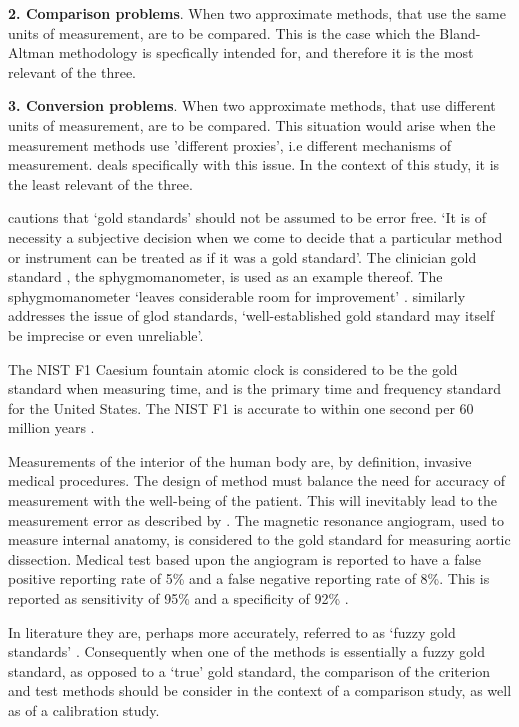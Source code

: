 \documentclass[MAIN.tex]{subfiles}
\begin{document}
	\bigskip \textbf{2. Comparison problems}. When two approximate
	methods, that use the same units of measurement, are to be
	compared. This is the case which the Bland-Altman methodology is
	specfically intended for, and therefore it is the most relevant of
	the three.
	
	\bigskip \textbf{3. Conversion problems}. When two approximate
	methods, that use different units of measurement, are to be
	compared. This situation would arise when the measurement methods
	use 'different proxies', i.e different mechanisms of measurement.
	\citet{lewis} deals specifically with this issue. In the context
	of this study, it is the least relevant of the three.
	
	\citet[p.47]{DunnSEME} cautions that `gold standards' should not be
	assumed to be error free. `It is of necessity a subjective
	decision when we come to decide that a particular method or
	instrument can be treated as if it was a gold standard'. The
	clinician gold standard , the sphygmomanometer, is used as an
	example thereof.  The sphygmomanometer `leaves considerable room
	for improvement' \citep{DunnSEME}. \citet{pizzi} similarly
	addresses the issue of glod standards, `well-established gold
	standard may itself be imprecise or even unreliable'.
	
	
	The NIST F1 Caesium fountain atomic clock is considered to be the
	gold standard when measuring time, and is the primary time and
	frequency standard for the United States. The NIST F1 is accurate
	to within one second per 60 million years \citep{NIST}.
	
	Measurements of the interior of the human body are, by definition,
	invasive medical procedures. The design of method must balance the
	need for accuracy of measurement with the well-being of the
	patient. This will inevitably lead to the measurement error as
	described by \citet{DunnSEME}. The magnetic resonance angiogram,
	used to measure internal anatomy,  is considered to the gold
	standard for measuring aortic dissection. Medical test based upon
	the angiogram is reported to have a false positive reporting rate
	of 5\% and a false negative reporting rate of 8\%. This is
	reported as sensitivity of 95\% and a specificity of 92\%
	\citep{ACR}.
	
	In literature they are, perhaps more accurately, referred to as
	`fuzzy gold standards' \citep{phelps}. Consequently when one of the methods is
	essentially a fuzzy gold standard, as opposed to a `true' gold
	standard, the comparison of the criterion and test methods should
	be consider in the context of a comparison study, as well as of a
	calibration study.
\end{document}

